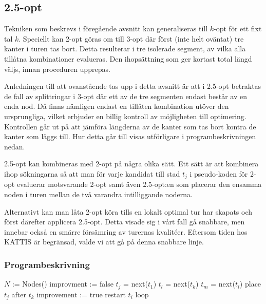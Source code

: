 \documentclass[a4paper,12pt]{article}
\renewcommand{\*}{\ensuremath{\cdot}}
\begin{document}
\subsection{2.5-opt} 


Tekniken som beskrevs i föregående avsnitt kan generaliseras till $k$-opt för
ett fixt tal $k$. Speciellt kan 2-opt göras om till 3-opt där först (inte helt
oväntat) tre kanter i turen tas bort. Detta resulterar i tre isolerade segment,
av vilka alla tillåtna kombinationer evalueras. Den ihopsättning som ger kortast
total längd väljs, innan proceduren upprepas.

Anledningen till att ovanstående tas upp i detta avsnitt är att i 2.5-opt
betraktas de fall av splittringar i 3-opt där ett av de tre segmenten endast
består av en enda nod. Då finns nämligen endast en tillåten kombination utöver
den ursprungliga, vilket erbjuder en billig kontroll av möjligheten till
optimering. Kontrollen går ut på att jämföra längderna av de kanter som tas bort
kontra de kanter som läggs till. Hur detta går till visas utförligare i
programbeskrivningen nedan.

2.5-opt kan kombineras med 2-opt på några olika sätt. Ett sätt är att kombinera
ihop sökningarna så att man för varje kandidat till stad $t_j$ i pseudo-koden
för 2-opt evaluerar motsvarande 2-opt samt även 2.5-opt:en som placerar den
ensamma noden i turen mellan de två varandra intilliggande noderna.

Alternativt kan man låta 2-opt köra tills en lokalt optimal tur har skapats och
först därefter applicera 2.5-opt. Detta visade sig i vårt fall gå snabbare, men
innebar också en smärre försämring av turernas kvalitéer. Eftersom tiden hos
KATTIS är begränsad, valde vi att gå på denna snabbare linje.


\subsubsection{Programbeskrivning}

\begin{algorithmic}
    \STATE $N$ := Nodes()
        \STATE improvment := false
            \STATE $t_j$ = next($t_1$)
                \STATE $t_l$ = next($t_k$)
                \STATE $t_m$ = next($t_l$)
                    \STATE place $t_j$ after $t_k$
                    \STATE improvement := true
                    \STATE restart $t_i$ loop
                \ENDIF
            \ENDFOR
        \ENDFOR
    \ENDWHILE
\end{algorithmic}
\end{document}
